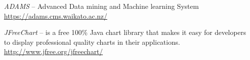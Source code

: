 %

\begin{thebibliography}{999}

		\textit{ADAMS} -- Advanced Data mining and Machine learning System \\
		\url{https://adams.cms.waikato.ac.nz/}{}

		\textit{JFreeChart} -- is a free 100\% Java chart library that
		makes it easy for developers to display professional quality
		charts in their applications. \\
		\url{http://www.jfree.org/jfreechart/}{}

\end{thebibliography}
